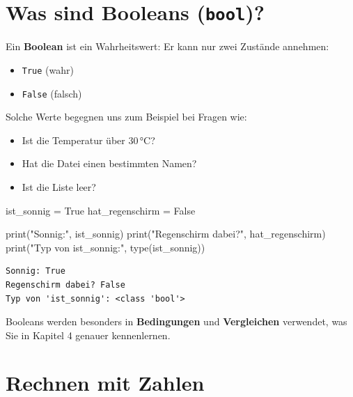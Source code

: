 \documentclass[
  letterpaper,
  DIV=11,
  numbers=noendperiod]{scrreprt}
\newenvironment{Shaded}{\begin{snugshade}}{\end{snugshade}}
\newcommand{\BuiltInTok}[1]{\textcolor[rgb]{0.00,0.23,0.31}{#1}}
\newcommand{\NormalTok}[1]{\textcolor[rgb]{0.00,0.23,0.31}{#1}}
\newcommand{\OperatorTok}[1]{\textcolor[rgb]{0.37,0.37,0.37}{#1}}
\newcommand{\StringTok}[1]{\textcolor[rgb]{0.13,0.47,0.30}{#1}}
\newcommand{\VariableTok}[1]{\textcolor[rgb]{0.07,0.07,0.07}{#1}}
\providecommand{\tightlist}{%
  \setlength{\itemsep}{0pt}\setlength{\parskip}{0pt}}\usepackage{longtable,booktabs,array}
\begin{document}
\section{\texorpdfstring{Was sind Booleans
(\texttt{bool})?}{Was sind Booleans (bool)?}}\label{was-sind-booleans-bool}

Ein \textbf{Boolean} ist ein Wahrheitswert: Er kann nur zwei Zustände
annehmen:

\begin{itemize}
\tightlist
\item
  \texttt{True} (wahr)
\item
  \texttt{False} (falsch)
\end{itemize}

Solche Werte begegnen uns zum Beispiel bei Fragen wie:

\begin{itemize}
\tightlist
\item
  Ist die Temperatur über 30\,°C?
\item
  Hat die Datei einen bestimmten Namen?
\item
  Ist die Liste leer?
\end{itemize}

\begin{Shaded}
\begin{Highlighting}[]
\NormalTok{ist\_sonnig }\OperatorTok{=} \VariableTok{True}
\NormalTok{hat\_regenschirm }\OperatorTok{=} \VariableTok{False}

\BuiltInTok{print}\NormalTok{(}\StringTok{"Sonnig:"}\NormalTok{, ist\_sonnig)}
\BuiltInTok{print}\NormalTok{(}\StringTok{"Regenschirm dabei?"}\NormalTok{, hat\_regenschirm)}
\BuiltInTok{print}\NormalTok{(}\StringTok{"Typ von \textquotesingle{}ist\_sonnig\textquotesingle{}:"}\NormalTok{, }\BuiltInTok{type}\NormalTok{(ist\_sonnig))}
\end{Highlighting}
\end{Shaded}

\begin{verbatim}
Sonnig: True
Regenschirm dabei? False
Typ von 'ist_sonnig': <class 'bool'>
\end{verbatim}

Booleans werden besonders in \textbf{Bedingungen} und
\textbf{Vergleichen} verwendet, was Sie in Kapitel 4 genauer
kennenlernen.

\section{Rechnen mit Zahlen}\label{rechnen-mit-zahlen}
\end{document}
